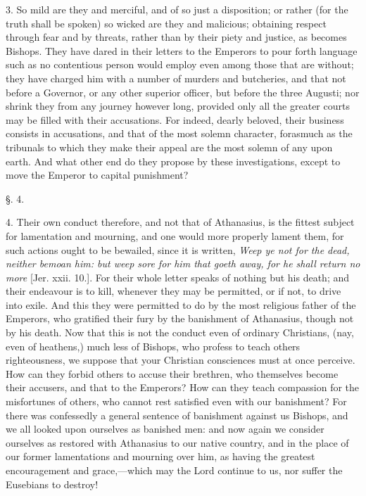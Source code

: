 3. So mild are they and merciful, and of so just
a disposition; or rather (for the truth shall be spoken) so wicked are
they and malicious; obtaining respect through fear and by threats,
rather than by their piety and justice, as becomes Bishops. They have
dared in their letters to the Emperors to pour forth language such as
no contentious person would employ even among those that are without;
they have charged him with a number of murders and butcheries, and
that not before a Governor, or any other superior officer, but before
the three Augusti; nor shrink they from any journey however long,
provided only all the greater courts may be filled with their
accusations. For indeed, dearly beloved, their business consists in
accusations, and that of the most solemn character, forasmuch as the
tribunals to which they make their appeal are the most solemn of any
upon earth. And what other end do they propose by these
investigations, except to move the Emperor to capital punishment?

§. 4.

4. Their own conduct therefore, and not that of
Athanasius, is the fittest subject for lamentation and mourning, and
one would more properly lament them, for such actions ought to be
bewailed, since it is written, \emph{Weep ye not for the dead, neither
bemoan him: but weep sore for him that goeth away, for he shall return
no more} [Jer. xxii. 10.]. For their whole letter speaks of nothing
but his death; and their endeavour is to kill, whenever they may be
permitted, or if not, to drive into exile. And this they were
permitted to do by the most religious father of the Emperors, who
gratified their fury by the banishment of Athanasius, though not by
his death. Now that this is not the conduct even of ordinary
Christians, (nay, even of heathens,) much less of Bishops, who profess
to teach others righteousness, we suppose that your Christian
consciences must at once perceive. How can they forbid others to
accuse their brethren, who themselves become their accusers, and that
to the Emperors? How can they teach compassion for the misfortunes of
others, who cannot rest satisfied even with our banishment? For there
was confessedly a general sentence of banishment against us Bishops,
and we all looked upon ourselves as banished men: and now again we
consider ourselves as restored with Athanasius to our native country,
and in the place of our former lamentations and mourning over him, as
having the greatest encouragement and grace,—which may the Lord
continue to us, nor suffer the Eusebians to destroy!

